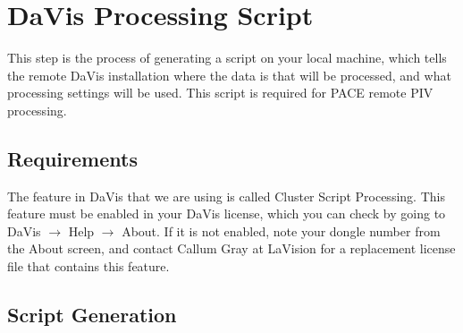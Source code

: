 \documentclass{article}
\begin{document}
	\section{DaVis Processing Script}
	This step is the process of generating a script on your local machine, which tells the remote DaVis installation where the data is that will be processed, and what processing settings will be used.  This script is required for PACE remote PIV processing.
	
	\subsection{Requirements}
	The feature in DaVis that we are using is called Cluster Script Processing.  This feature must be enabled in your DaVis license, which you can check by going to DaVis $\rightarrow$ Help $\rightarrow$ About.  If it is not enabled, note your dongle number from the About screen, and contact Callum Gray at LaVision for a replacement license file that contains this feature.
	
	\subsection{Script Generation}
	
\end{document}
